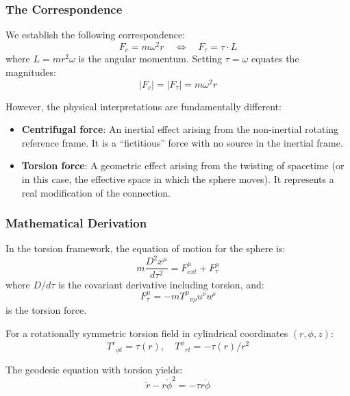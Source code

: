 \documentclass[UTF8]{ctex}\n\documentclass[12pt,a4paper]{article}
\begin{document}
\subsubsection{The Correspondence}

We establish the following correspondence:
\begin{equation}
    F_c = m\omega^2 r \quad \Longleftrightarrow \quad F_\tau = \tau \cdot L
\end{equation}
where $L = mr^2\omega$ is the angular momentum. Setting $\tau = \omega$ equates the magnitudes:
\begin{equation}
    |F_c| = |F_\tau| = m\omega^2 r
\end{equation}

However, the physical interpretations are fundamentally different:
\begin{itemize}
    \item \textbf{Centrifugal force}: An inertial effect arising from the non-inertial rotating reference frame. It is a ``fictitious'' force with no source in the inertial frame.
    \item \textbf{Torsion force}: A geometric effect arising from the twisting of spacetime (or in this case, the effective space in which the sphere moves). It represents a real modification of the connection.
\end{itemize}

\subsubsection{Mathematical Derivation}

In the torsion framework, the equation of motion for the sphere is:
\begin{equation}
    m\frac{D^2 x^\mu}{d\tau^2} = F^\mu_{ext} + F^\mu_\tau
\end{equation}
where $D/d\tau$ is the covariant derivative including torsion, and:
\begin{equation}
    F^\mu_\tau = -mT^\mu{}_{\nu\rho}u^\nu u^\rho
\end{equation}
is the torsion force.

For a rotationally symmetric torsion field in cylindrical coordinates $(r, \phi, z)$:
\begin{equation}
    T^r{}_{\phi t} = \tau(r), \quad T^\phi{}_{rt} = -\tau(r)/r^2
\end{equation}

The geodesic equation with torsion yields:
\begin{equation}
    \ddot{r} - r\dot{\phi}^2 = -\tau r \dot{\phi}
\end{equation}
\end{document}
